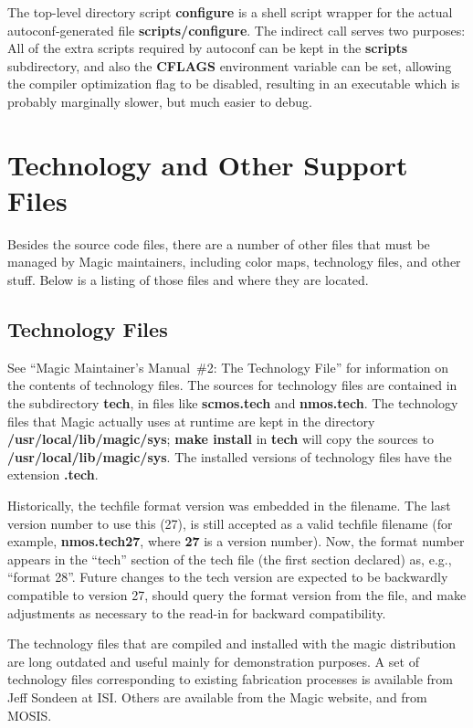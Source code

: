 \documentclass[letterpaper,twoside,12pt]{article}
\begin{document}
The top-level directory script {\bfseries configure} is a shell script
wrapper for the actual autoconf-generated file {\bfseries
scripts/configure}.  The indirect call serves two purposes:  All of
the extra scripts required by autoconf can be kept in the {\bfseries
scripts} subdirectory, and also the {\bfseries CFLAGS} environment
variable can be set, allowing the compiler optimization flag to be
disabled, resulting in an executable which is probably marginally
slower, but much easier to debug.

\section{Technology and Other Support Files}

Besides the source code files, there are a number of other
files that must be managed by Magic maintainers, including
color maps, technology files, and other stuff.  Below is
a listing of those files and where they are located.

\subsection{Technology Files}

See ``Magic Maintainer's Manual\ \#2: The Technology File'' for information on
the contents of technology files.
The sources for technology files are contained in the subdirectory
{\bfseries tech}, in files like {\bfseries scmos.tech} and {\bfseries nmos.tech}.
The technology files that Magic actually uses at runtime are kept in the
directory {\bfseries /usr/local/lib/magic/sys};%
{\bfseries make install} in {\bfseries tech}
will copy the sources to {\bfseries /usr/local/lib/magic/sys}.%
The installed versions of technology files have the extension {\bfseries .tech}.

Historically, the techfile format version was embedded in the filename.
The last version number to use this (27), is still accepted as a valid
techfile filename (for example, {\bfseries nmos.tech27}, where {\bfseries 27} is a
version number).  Now, the format number appears in the ``tech'' section of the
tech file (the first section declared) as, e.g., ``format 28''.  Future
changes to the tech version are expected to be backwardly compatible to version
27, should query the format version from the file, and make adjustments as
necessary to the read-in for backward compatibility.

The technology files that are compiled and installed with the magic
distribution are long outdated and useful mainly for demonstration purposes.
A set of technology files corresponding to existing fabrication processes
is available from Jeff Sondeen at ISI.  Others are available from the Magic
website, and from MOSIS.
\end{document}
